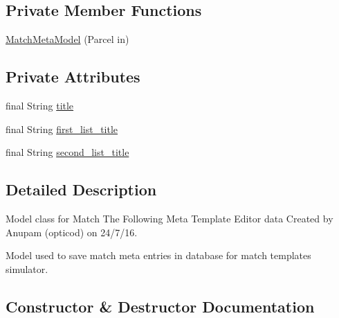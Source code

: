 \subsection*{Private Member Functions}
\begin{DoxyCompactItemize}
\item 
\hyperlink{classorg_1_1buildmlearn_1_1toolkit_1_1matchtemplate_1_1data_1_1MatchMetaModel_a819e4465313a783a840982e36aeb0ab5}{Match\+Meta\+Model} (Parcel in)
\end{DoxyCompactItemize}
\subsection*{Private Attributes}
\begin{DoxyCompactItemize}
\item 
final String \hyperlink{classorg_1_1buildmlearn_1_1toolkit_1_1matchtemplate_1_1data_1_1MatchMetaModel_a4c103cc147f50bef03dd5e9587bb8de1}{title}
\item 
final String \hyperlink{classorg_1_1buildmlearn_1_1toolkit_1_1matchtemplate_1_1data_1_1MatchMetaModel_a0a805b3d15cea77b0ee123f4d4875120}{first\+\_\+list\+\_\+title}
\item 
final String \hyperlink{classorg_1_1buildmlearn_1_1toolkit_1_1matchtemplate_1_1data_1_1MatchMetaModel_a8f3a70b7cabdb5d17290543a065a2044}{second\+\_\+list\+\_\+title}
\end{DoxyCompactItemize}


\subsection{Detailed Description}
Model class for Match The Following Meta Template Editor data Created by Anupam (opticod) on 24/7/16. 

Model used to save match meta entries in database for match template\textquotesingle{}s simulator. 

\subsection{Constructor \& Destructor Documentation}
